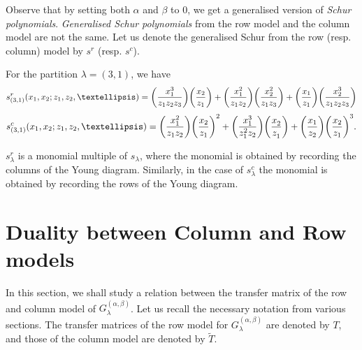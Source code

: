 \documentclass[ALCO, Unicode]{cedram}
\DeclarePairedDelimiter\autobracket{(}{)}
\newcommand{\br}[1]{\autobracket*{#1}}
\newcommand\Gg{{G^{(\alpha,\beta)}_{\lambda}}}
\begin{document}
\begin{rema}
Observe that by setting both $\alpha$ and $\beta$ to $0$, we get a generalised version of \emph{Schur polynomials}. \emph{Generalised Schur polynomials} from the row model and the column model are not the same. 
Let us denote the generalised Schur from the row (resp. column) model by $s^{r}$ (resp. $s^{c}$).
\begin{exam}
For the partition $\lambda=(3,1)$, we have
\[
s^{r}_{(3,1)}(x_1,x_2;z_1,z_2,\dots)= \br{\frac{x^{3}_1}{z_1 z_2 z_3}}\br{\frac{x_2}{z_1}}+\br{\frac{x^{2}_1}{z_1 z_2}}\br{\frac{x^{2}_2}{z_1 z_3}}+ \br{\frac{x_1}{z_1}}\br{\frac{x^{3}_2}{z_1 z_2 z_3}}
\]
\[s^{c}_{(3,1)}(x_1,x_2;z_1,z_2,\dots)=\br{\frac{x^{2}_1}{z_1 z_2}}\br{\frac{x_2}{z_1}}^{2}+ \br{\frac{x^{3}_1}{z^{2}_1 z_2}} \br{\frac{x^{}_2}{z^{}_1}}+\br{\frac{x_1}{z_2}}\br{\frac{x_2}{z_1}}^{3}.
\]
\end{exam}
\end{rema}

$s^{r}_{\lambda}$ is a monomial multiple of $s_{\lambda}$, where the monomial is obtained by recording the columns of the Young diagram. Similarly, in the case of $s^{c}_{\lambda}$ the monomial is obtained by recording the rows of the Young diagram.









\section{Duality between Column and Row models}
\label{dualitybetweenmodels}

In this section, we shall study a relation between the transfer matrix of the row and column model of $\Gg$. Let us recall the necessary notation from various sections. The transfer matrices of the row model for $\Gg$ are denoted by $T$, and those of the column model are denoted by $\widetilde{T}$.
\end{document}
